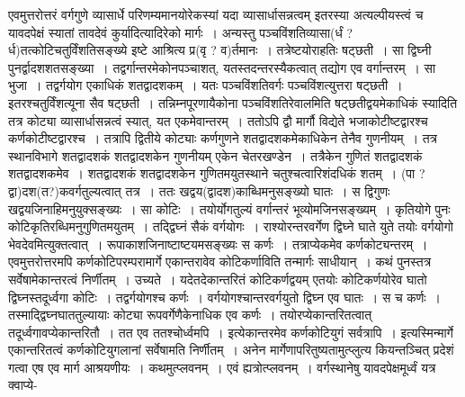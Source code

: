 \documentclass[11pt, openany]{book}
\begin{document}
\noindent एवमुत्तरोत्तरं वर्गगुणे व्यासार्धे परिणम्यमानयोरेकस्यां यदा व्यासार्धासन्नत्वम् इतरस्या अत्यल्पीयस्त्वं च यावदपेक्षं स्यातां तावदेवं कुर्यादित्यादिरेको मार्गः~। अन्यस्तु पञ्चविंशतिव्यासा(र्धं ? र्ध)तत्कोटिचतुर्विंशतिसङ्ख्ये इष्टे आश्रित्य प्र(वृ ? व)र्तमानः~। तत्रेष्टयोराहतिः षट्छती~। सा द्विघ्नी पुनर्द्वादशशतसङ्ख्या~। तद्वर्गान्तरमेकोनपञ्चाशत्, यतस्तदन्तरस्यैकत्वात् तद्योग एव वर्गान्तरम्~। सा भुजा~। तद्वर्गयोग एकाधिकं शतद्वादशकम्~। यतः पञ्चविंशतिवर्गः पञ्चविंशत्युत्तरा षट्छती~। इतरश्चतुर्विंशत्यूना सैव षट्छती~। तन्निम्नपूरणायैकोना पञ्चविंशतिरेवालमिति षट्छतीद्वयमेकाधिकं स्यादिति तत्र कोट्या व्यासार्धासन्नत्वं स्यात्, यत एकमेवान्तरम्~। ततोऽपि द्वौ मार्गौ विद्येते भजाकोटीष्टद्वारश्च कर्णकोटीष्टद्वारश्च~। तत्रापि द्वितीये कोट्याः कर्णगुणने शतद्वादशकमेकाधिकेन तेनैव गुणनीयम्~। तत्र स्थानविभागे शतद्वादशकं शतद्वादशकेन गुणनीयम् एकेन चेतरखण्डेन~। तत्रैकेन गुणितं शतद्वादशकं शतद्वादशकमेव~। शतद्वादशकं शतद्वादशकेन गुणितमयुतस्थाने चतुश्चत्वारिशंदधिकं शतम्~। (पा ? द्वा)दश(त?)कवर्गतुल्यत्वात् तत्र~। ततः खद्वय(द्वादश)काब्धिमनुसङ्ख्यो घातः~। स द्विगुणः खद्वयजिनाहिमनुयुक्सङ्ख्यः~। सा कोटिः~। तयोर्योगतुल्यं वर्गान्तरं भूव्योमजिनसङ्ख्यम्~। कृतियोगे पुनः कोटिकृतिरब्धिमनुगुणितमयुतम्~। तद्द्विघ्नं सैकं वर्गयोगः~। {\qt राश्योरन्तरवर्गेण द्विघ्ने घाते युते तयोः वर्गयोगो भेवदेवमि}त्युक्तत्वात्~। रूपाकाशजिनाष्टाष्टयमसङ्ख्यः स कर्णः~। तत्राप्येकमेव कर्णकोट्यन्तरम्~। एवमुत्तरोत्तरमपि कर्णकोटिपरम्परामार्गे एकान्तरावेव कोटिकर्णाविति तन्मार्गः साधीयान्~। कथं पुनस्तत्र सर्वेषामेकान्तरत्वं निर्णीतम्~। उच्यते~। यदेतदेकान्तरितं कोटिकर्णद्वयम् एतयोः कोटिकर्णयोरेव घातो द्विघ्नस्तदूर्ध्वगा कोटिः~। तद्वर्गयोगश्च कर्णः~। वर्गयोगश्चान्तरवर्गयुतो द्विघ्न एव घातः~। स च कर्णः~। तस्माद्द्विघ्नघाततुल्यायाः कोट्या रूपवर्गेणैकेनाधिक एव कर्णः~। तयोरप्येकान्तरितत्वात् तदूर्ध्वगावप्येकान्तरितौ~। तत एव ततश्चोर्ध्वमपि~। इत्येकान्तरमेव कर्णकोटियुगं सर्वत्रापि~। इत्यस्मिन्मार्गे एकान्तरितत्वं कर्णकोटियुगलानां सर्वेषामति निर्णीतम्~। अनेन मार्गेणापरितुष्यतामुत्प्लुत्य कियन्तञ्चित् प्रदेशं गत्वा एष एव मार्ग आश्रयणीयः~। कथमुत्प्लवनम्~। एवं ह्यत्रोत्प्लवनम्~। वर्गस्थानेषु यावदपेक्षमूर्ध्वं यत्र क्वाप्ये-

\newpage
\end{document}
